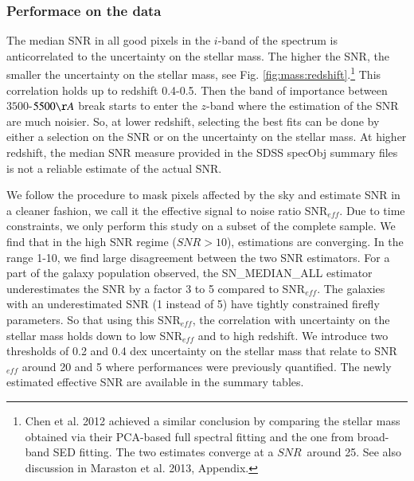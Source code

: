 \documentclass[onecolumn]{aa}
\begin{document}
\subsubsection{Performace on the data}
The median SNR in all good pixels in the $i$-band of the spectrum is anticorrelated to the uncertainty on the stellar mass. The higher the SNR, the smaller the uncertainty on the stellar mass, see Fig. \ref{fig:mass:redshift}.\footnote{Chen et al. 2012 achieved a similar conclusion by comparing the stellar mass obtained via their PCA-based full spectral fitting and the one from broad-band SED fitting. The two estimates converge at a $SNR$~around 25. See also discussion in Maraston et al. 2013, Appendix.} 
This correlation holds up to redshift 0.4-0.5. 
Then the band of importance between $3500$-$5500\AA$ break starts to enter the $z$-band where the estimation of the SNR are much noisier. 
So, at lower redshift, selecting the best fits can be done by either a selection on the SNR or on the uncertainty on the stellar mass. 
At higher redshift, the median SNR measure provided in the SDSS specObj summary files is not a reliable estimate of the actual SNR. 

We follow the \citet{2013AJ....145...69L} procedure to mask pixels affected by the sky and estimate SNR in a cleaner fashion, we call it the effective signal to noise ratio SNR$_{eff}$. 
Due to time constraints, we only perform this study on a subset of the complete sample. 
We find that in the high SNR regime ($SNR>10$), estimations are converging. 
In the range 1-10, we find large disagreement between the two SNR estimators. 
For a part of the galaxy population observed, the SN\_MEDIAN\_ALL estimator underestimates the SNR by a factor 3 to 5 compared to SNR$_{eff}$. 
The galaxies with an underestimated SNR (1 instead of 5) have tightly constrained firefly parameters. 
So that using this SNR$_{eff}$, the correlation with uncertainty on the stellar mass holds down to low SNR$_{eff}$ and to high redshift. 
We introduce two thresholds of 0.2 and 0.4 dex uncertainty on the stellar mass that relate to SNR$_{eff}$ around 20 and 5 where performances were previously quantified. The newly estimated effective SNR are available in the summary tables.
\end{document}
